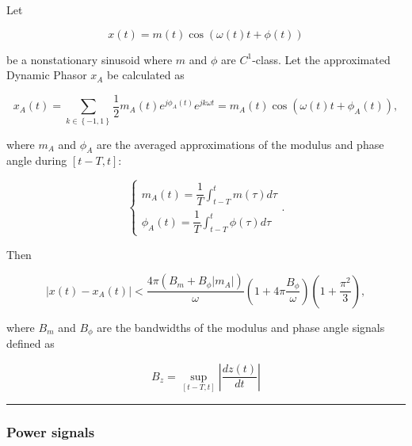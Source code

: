\begin{theorem}\label{theo:fdp_quasi_static}%
Let 

\begin{equation} x(t) = m(t)\cos\left(\omega(t) t + \phi(t)\right) \end{equation}

	\noindent be a nonstationary sinusoid where $m$ and $\phi$ are $C^1$-class. Let the approximated Dynamic Phasor $x_A$ be calculated as

\begin{equation} x_A(t) = \sum_{k\in\left\{-1,1\right\}} \dfrac{1}{2} m_A (t) e^{j\phi_A(t)} e^{jk\omega t} = m_A(t)\cos\left(\omega(t) t + \phi_A(t)\right), \end{equation}

	\noindent where $m_A$ and $\phi_A$ are the averaged approximations of the modulus and phase angle during $\left[t-T,t\right]$:

\begin{equation}
\left\{\begin{array}{l}
	m_A(t) = \dfrac{1}{T} \displaystyle\int_{t-T}^t m(\tau)d\tau \\[5mm]
	\phi_A(t) = \dfrac{1}{T} \displaystyle\int_{t-T}^t \phi(\tau)d\tau
\end{array}\right. .
\end{equation}

	Then 

\begin{equation} \left\lvert x(t) - x_A(t) \right\lvert  < \dfrac{4\pi \left(B_m + B_\phi \left\lvert m_A\right\rvert\right)}{\omega} \left(1 + 4\pi \dfrac{B_\phi}{\omega}\right) \left(1 + \dfrac{\pi^2}{3}\right), \end{equation}

	where $B_m$ and $B_\phi$ are the bandwidths of the modulus and phase angle signals defined as


\begin{equation} B_z = \sup_{\left[t-T,t\right]} \left\lvert \dfrac{dz(t)}{dt}\right\rvert \end{equation}
\end{theorem}
\hrule
\vspace{5mm}

\subsubsection{Power signals} %

